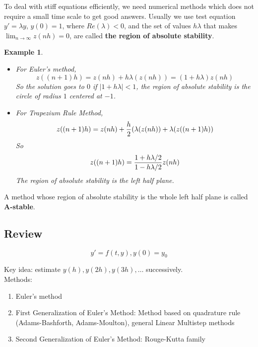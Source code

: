 \documentclass{article} %
\theoremstyle{break}
\newtheorem{exa}[definition]{Example}
\begin{document}
To deal with stiff equations efficiently, we need numerical methods which does not require a small time scale to get good answers. Usually we use test equation $y'=\lambda y$, $y(0)=1$, where $Re(\lambda)<0$, and the set of values $h\lambda$ that makes $\lim_{n\rightarrow \infty}z(nh)=0$, are called {\bf the region of absolute stability}.

\begin{exa}
  \begin{itemize}
\item For Euler's method,
  \[z((n+1)h)=z(nh)+h\lambda(z(nh))=(1+h\lambda)z(nh)\]
  So the solution goes to $0$ if $|1+h\lambda|<1$, the region of absolute stability is the circle of radius $1$ centered at $-1$.
\item For Trapezium Rule Method,
  \[z((n+1)h)=z(nh)+{h\over 2}(\lambda(z(nh))+\lambda(z((n+1)h))\]
 So
  \[z((n+1)h)={1+h\lambda/2\over 1-h\lambda/2}z(nh)\]
  The region of absolute stability is the left half plane.
  \end{itemize}
\end{exa}

A method whose region of absolute stability is the whole left half plane is called {\bf A-stable}.



\subsection{Review}

\[y'=f(t, y), y(0)=y_0\]

Key idea: estimate $y(h), y(2h), y(3h), \dots$ successively.\\

Methods:
\begin{enumerate}
\item Euler's method
\item First Generalization of Euler's Method: Method based on quadrature rule (Adams-Bashforth, Adams-Moulton), general Linear Multistep methods 
\item Second Generalization of Euler's Method: Rouge-Kutta family
\end{enumerate}
\end{document}
